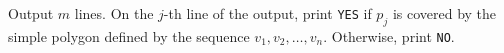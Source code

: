 Output $m$ lines. On the $j$-th line of the output, print \verb+YES+ if 
$p_j$ is covered by the simple polygon defined by the sequence 
$v_1,v_2,\dots,v_n$. Otherwise, print \verb+NO+.
